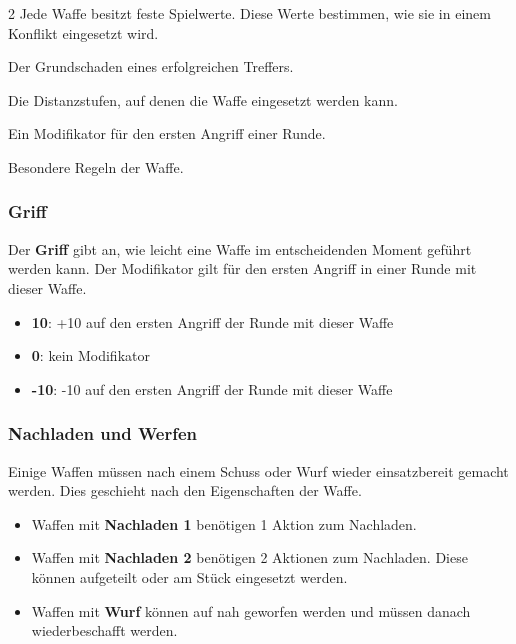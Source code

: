 \begin{multicols*}{2}
Jede Waffe besitzt feste Spielwerte.
Diese Werte bestimmen, wie sie in einem Konflikt eingesetzt wird.

\begin{description}[style=nextline,leftmargin=0pt]
\item[\textbf{Schaden}] Der Grundschaden eines erfolgreichen Treffers.
\item[\textbf{Reichweite}] Die Distanzstufen, auf denen die Waffe eingesetzt werden kann.
\item[\textbf{Griff}] Ein Modifikator für den ersten Angriff einer Runde.
\item[\textbf{Eigenschaften}] Besondere Regeln der Waffe.
\end{description}

\subsubsection{Griff}\label{subsec:griff}

Der \textbf{Griff} gibt an, wie leicht eine Waffe im entscheidenden Moment geführt werden kann.
Der Modifikator gilt für den ersten Angriff in einer Runde mit dieser Waffe.

\begin{itemize}[leftmargin=*]
\item \textbf{10}: +10 auf den ersten Angriff der Runde mit dieser Waffe
\item \textbf{0}: kein Modifikator
\item \textbf{-10}: -10 auf den ersten Angriff der Runde mit dieser Waffe
\end{itemize}

\subsubsection{Nachladen und Werfen}

Einige Waffen müssen nach einem Schuss oder Wurf wieder einsatzbereit gemacht werden.
Dies geschieht nach den Eigenschaften der Waffe.

\begin{itemize}[leftmargin=*]
\item Waffen mit \textbf{Nachladen 1} benötigen 1 Aktion zum Nachladen.
\item Waffen mit \textbf{Nachladen 2} benötigen 2 Aktionen zum Nachladen. Diese können aufgeteilt oder am Stück eingesetzt werden.
\item Waffen mit \textbf{Wurf} können auf nah geworfen werden und müssen danach wiederbeschafft werden.
\end{itemize}


\end{multicols*}
